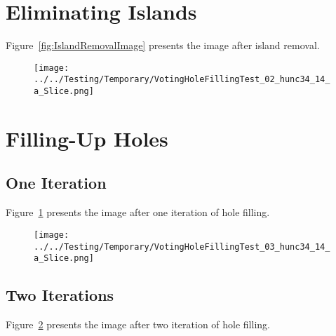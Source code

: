 \documentclass{InsightArticle}
\begin{document}
\section{Eliminating Islands}

\begin{center}

\end{center}

Figure~\ref{fig:IslandRemovalImage} presents the image after island removal.


\clearpage
\begin{figure}
\center
\texttt{[image: ../../Testing/Temporary/VotingHoleFillingTest\_02\_hunc34\_14\_a\_Slice.png]}
\label{fig:HoleFillingIteration01Image}
\end{figure}


\section{Filling-Up Holes}

\begin{center}

\end{center}


\subsection{One Iteration}

Figure~\ref{fig:HoleFillingIteration01Image} presents the image after one iteration of hole filling.


\clearpage
\begin{figure}
\center
\texttt{[image: ../../Testing/Temporary/VotingHoleFillingTest\_03\_hunc34\_14\_a\_Slice.png]}
\label{fig:HoleFillingIteration02Image}
\end{figure}


\subsection{Two Iterations}

Figure~\ref{fig:HoleFillingIteration02Image} presents the image after two iteration of hole filling.
\end{document}
